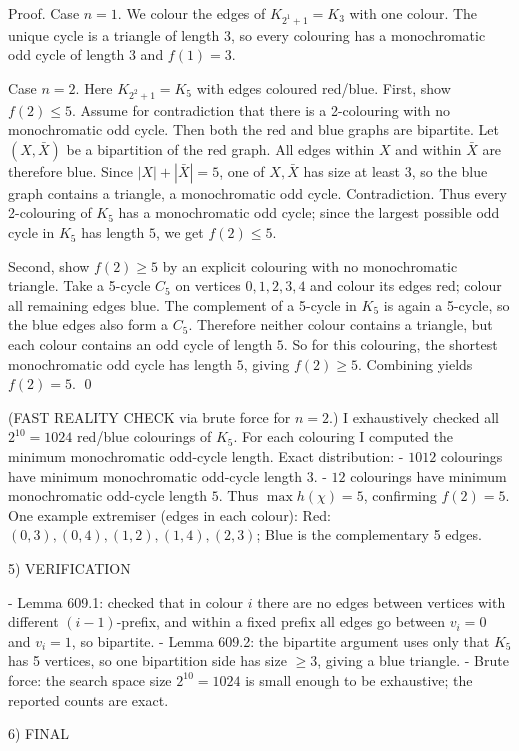 Proof.
Case $n=1$.
We colour the edges of $K_{2^1+1}=K_3$ with one colour. The unique cycle is a triangle of length $3$, so every colouring has a monochromatic odd cycle of length $3$ and $f(1)=3$.

Case $n=2$.
Here $K_{2^2+1}=K_5$ with edges coloured red/blue.
First, show $f(2)\le 5$.
Assume for contradiction that there is a 2-colouring with no monochromatic odd cycle.
Then both the red and blue graphs are bipartite.
Let $(X,\bar X)$ be a bipartition of the red graph.
All edges within $X$ and within $\bar X$ are therefore blue.
Since $|X|+|\bar X|=5$, one of $X,\bar X$ has size at least $3$, so the blue graph contains a triangle, a monochromatic odd cycle.
Contradiction.
Thus every 2-colouring of $K_5$ has a monochromatic odd cycle; since the largest possible odd cycle in $K_5$ has length $5$, we get $f(2)\le 5$.

Second, show $f(2)\ge 5$ by an explicit colouring with no monochromatic triangle.
Take a 5-cycle $C_5$ on vertices $0,1,2,3,4$ and colour its edges red; colour all remaining edges blue.
The complement of a 5-cycle in $K_5$ is again a 5-cycle, so the blue edges also form a $C_5$.
Therefore neither colour contains a triangle, but each colour contains an odd cycle of length $5$.
So for this colouring, the shortest monochromatic odd cycle has length $5$, giving $f(2)\ge 5$.
Combining yields $f(2)=5$.
\qed

(FAST REALITY CHECK via brute force for $n=2$.)
I exhaustively checked all $2^{10}=1024$ red/blue colourings of $K_5$.
For each colouring I computed the minimum monochromatic odd-cycle length.
Exact distribution:
- $1012$ colourings have minimum monochromatic odd-cycle length $3$.
- $12$ colourings have minimum monochromatic odd-cycle length $5$.
Thus $\max h(\chi)=5$, confirming $f(2)=5$.
One example extremiser (edges in each colour):
Red: $(0,3),(0,4),(1,2),(1,4),(2,3)$; Blue is the complementary 5 edges.

5) VERIFICATION

- Lemma 609.1: checked that in colour $i$ there are no edges between vertices with different $(i-1)$-prefix, and within a fixed prefix all edges go between $v_i=0$ and $v_i=1$, so bipartite.
- Lemma 609.2: the bipartite argument uses only that $K_5$ has 5 vertices, so one bipartition side has size $\ge 3$, giving a blue triangle.
- Brute force: the search space size $2^{10}=1024$ is small enough to be exhaustive; the reported counts are exact.

6) FINAL

